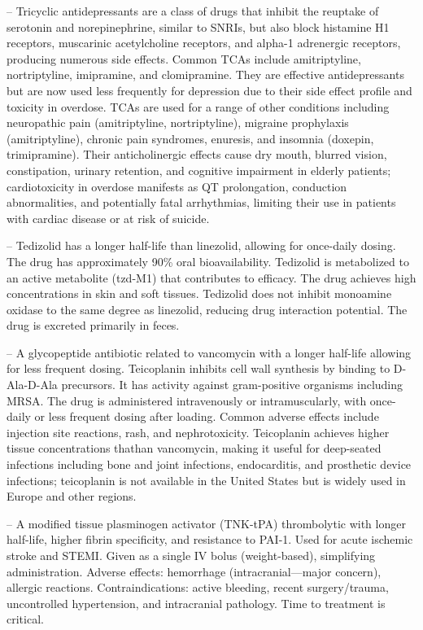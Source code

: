 -- Tricyclic antidepressants are a class of drugs that inhibit the reuptake of serotonin and norepinephrine, similar to SNRIs, but also block histamine H1 receptors, muscarinic acetylcholine receptors, and alpha-1 adrenergic receptors, producing numerous side effects. Common TCAs include amitriptyline, nortriptyline, imipramine, and clomipramine. They are effective antidepressants but are now used less frequently for depression due to their side effect profile and toxicity in overdose. TCAs are used for a range of other conditions including neuropathic pain (amitriptyline, nortriptyline), migraine prophylaxis (amitriptyline), chronic pain syndromes, enuresis, and insomnia (doxepin, trimipramine). Their anticholinergic effects cause dry mouth, blurred vision, constipation, urinary retention, and cognitive impairment in elderly patients; cardiotoxicity in overdose manifests as QT prolongation, conduction abnormalities, and potentially fatal arrhythmias, limiting their use in patients with cardiac disease or at risk of suicide.

-- Tedizolid has a longer half-life than linezolid, allowing for once-daily dosing. The drug has approximately 90\% oral bioavailability. Tedizolid is metabolized to an active metabolite (tzd-M1) that contributes to efficacy. The drug achieves high concentrations in skin and soft tissues. Tedizolid does not inhibit monoamine oxidase to the same degree as linezolid, reducing drug interaction potential. The drug is excreted primarily in feces.

-- A glycopeptide antibiotic related to vancomycin with a longer half-life allowing for less frequent dosing. Teicoplanin inhibits cell wall synthesis by binding to D-Ala-D-Ala precursors. It has activity against gram-positive organisms including MRSA. The drug is administered intravenously or intramuscularly, with once-daily or less frequent dosing after loading. Common adverse effects include injection site reactions, rash, and nephrotoxicity. Teicoplanin achieves higher tissue concentrations thathan vancomycin, making it useful for deep-seated infections including bone and joint infections, endocarditis, and prosthetic device infections; teicoplanin is not available in the United States but is widely used in Europe and other regions.

-- A modified tissue plasminogen activator (TNK-tPA) thrombolytic with longer half-life, higher fibrin specificity, and resistance to PAI-1. Used for acute ischemic stroke and STEMI. Given as a single IV bolus (weight-based), simplifying administration. Adverse effects: hemorrhage (intracranial—major concern), allergic reactions. Contraindications: active bleeding, recent surgery/trauma, uncontrolled hypertension, and intracranial pathology. Time to treatment is critical.

